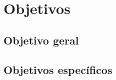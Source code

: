 \section{Objetivos}\label{session:objetivos}


\subsection{Objetivo geral }\label{session:objetivo_geral}




\subsection{Objetivos específicos}

